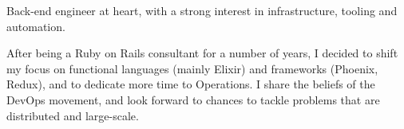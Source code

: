 

\begin{cvparagraph}

Back-end engineer at heart, with a strong interest in infrastructure, tooling and
automation.

After being a Ruby on Rails consultant for a number of years, I decided to
shift my focus on functional languages (mainly Elixir) and frameworks (Phoenix,
Redux), and to dedicate more time to Operations. I share the beliefs of the
DevOps movement, and look forward to chances to tackle problems that are
distributed and large-scale.
\end{cvparagraph}
